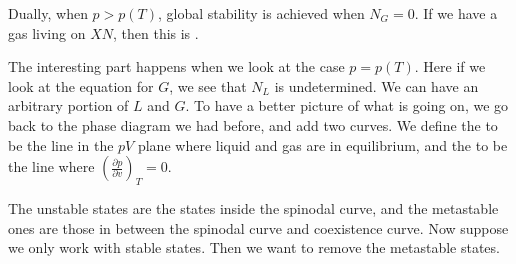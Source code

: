 \documentclass[a4paper]{article}
\def\isothermia{(1.6,0.3) (1.7,0.19847) (1.8,0.14429) (1.9,0.11496) (2.0,0.10000) (2.1,0.09349) (2.2,0.09194)}
\def\isothermib{(2.2,0.09194) (2.3,0.09328) (2.4,0.09623) (2.5,0.10000) (2.6,0.10411) (2.7,0.10825) (2.8,0.11224) (2.9,0.11600) (3.0,0.11944) (3.1,0.12257) (3.2,0.12536) (3.3,0.12782) (3.4,0.12997) (3.5,0.13184) (3.6,0.13343) (3.7,0.13477) (3.8,0.13588) (3.9,0.13679) (4.0,0.13750) (4.1,0.13804) (4.2,0.13843) (4.3,0.13867) (4.4,0.13879) (4.5,0.13880)}
\def\isothermic{(4.5,0.13880) (4.6,0.13871) (4.7,0.13852) (4.8,0.13825) (4.9,0.13791) (5.0,0.13750) (5.1,0.13703) (5.2,0.13652) (5.3,0.13595) (5.4,0.13535) (5.5,0.13471) (5.6,0.13404) (5.7,0.13334) (5.8,0.13262) (5.9,0.13187) (6.0,0.13111) (6.1,0.13033) (6.2,0.12954) (6.3,0.12874) (6.4,0.12793) (6.5,0.12711) (6.6,0.12629) (6.7,0.12546) (6.8,0.12463) (6.9,0.12379) (7.0,0.12296) (7.1,0.12212) (7.2,0.12129) (7.3,0.12046) (7.4,0.11963) (7.5,0.11880) (7.6,0.11798) (7.7,0.11716) (7.8,0.11635) (7.9,0.11554) (8.0,0.11473) (8.1,0.11393) (8.2,0.11314) (8.3,0.11235) (8.4,0.11157) (8.5,0.11080) (8.6,0.11003) (8.7,0.10927) (8.8,0.10851) (8.9,0.10776) (9.0,0.10702) (9.1,0.10629) (9.2,0.10556) (9.3,0.10484) (9.4,0.10413) (9.5,0.10342) (9.6,0.10272) (9.7,0.10203) (9.8,0.10135) (9.9,0.10067) (10.0,0.10000) (10.1,0.09934) (10.2,0.09868) (10.3,0.09803) (10.4,0.09739) (10.5,0.09675) (10.6,0.09613) (10.7,0.09550) (10.8,0.09489) (10.9,0.09428) (11.0,0.09368) (11.1,0.09308) (11.2,0.09249) (11.3,0.09191) (11.4,0.09133) (11.5,0.09076) (11.6,0.09020) (11.7,0.08964) (11.8,0.08909) (11.9,0.08854) (12.0,0.08801) (12.1,0.08747) (12.2,0.08694) (12.3,0.08642) (12.4,0.08590) (12.5,0.08539) (12.6,0.08489) (12.7,0.08438) (12.8,0.08389) (12.9,0.08340) (13.0,0.08291) (13.1,0.08243) (13.2,0.08196) (13.3,0.08149) (13.4,0.08103) (13.5,0.08057) (13.6,0.08011) (13.7,0.07966) (13.8,0.07921) (13.9,0.07877) (14.0,0.07834) (14.1,0.07790) (14.2,0.07748) (14.3,0.07705) (14.4,0.07663) (14.5,0.07622) (14.6,0.07581) (14.7,0.07540) (14.8,0.07500) (14.9,0.07460) (15.0,0.07421)}
\def\isothermi{\isothermia \isothermib \isothermic}
\def\isothermii{(1.8,0.3) (1.9,0.26107) (2.0,0.23150) (2.1,0.21303) (2.2,0.20153) (2.3,0.19444) (2.4,0.19016) (2.5,0.18767) (2.6,0.18629) (2.7,0.18560) (2.8,0.18530) (2.9,0.18521) (3.0,0.18519) (3.1,0.18518) (3.2,0.18513) (3.3,0.18499) (3.4,0.18477) (3.5,0.18444) (3.6,0.18401) (3.7,0.18347) (3.8,0.18285) (3.9,0.18213) (4.0,0.18133) (4.1,0.18046) (4.2,0.17952) (4.3,0.17852) (4.4,0.17747) (4.5,0.17637) (4.6,0.17523) (4.7,0.17406) (4.8,0.17285) (4.9,0.17163) (5.0,0.17038) (5.1,0.16911) (5.2,0.16783) (5.3,0.16654) (5.4,0.16524) (5.5,0.16393) (5.6,0.16263) (5.7,0.16132) (5.8,0.16001) (5.9,0.15871) (6.0,0.15741) (6.1,0.15612) (6.2,0.15483) (6.3,0.15355) (6.4,0.15228) (6.5,0.15102) (6.6,0.14977) (6.7,0.14853) (6.8,0.14730) (6.9,0.14608) (7.0,0.14488) (7.1,0.14368) (7.2,0.14250) (7.3,0.14133) (7.4,0.14018) (7.5,0.13903) (7.6,0.13790) (7.7,0.13679) (7.8,0.13568) (7.9,0.13459) (8.0,0.13352) (8.1,0.13245) (8.2,0.13140) (8.3,0.13037) (8.4,0.12934) (8.5,0.12833) (8.6,0.12733) (8.7,0.12634) (8.8,0.12537) (8.9,0.12441) (9.0,0.12346) (9.1,0.12252) (9.2,0.12160) (9.3,0.12068) (9.4,0.11978) (9.5,0.11889) (9.6,0.11801) (9.7,0.11715) (9.8,0.11629) (9.9,0.11545) (10.0,0.11461) (10.1,0.11379) (10.2,0.11297) (10.3,0.11217) (10.4,0.11138) (10.5,0.11060) (10.6,0.10982) (10.7,0.10906) (10.8,0.10831) (10.9,0.10756) (11.0,0.10683) (11.1,0.10610) (11.2,0.10539) (11.3,0.10468) (11.4,0.10398) (11.5,0.10329) (11.6,0.10261) (11.7,0.10193) (11.8,0.10127) (11.9,0.10061) (12.0,0.09996) (12.1,0.09932) (12.2,0.09868) (12.3,0.09806) (12.4,0.09744) (12.5,0.09683) (12.6,0.09622) (12.7,0.09562) (12.8,0.09503) (12.9,0.09445) (13.0,0.09387) (13.1,0.09330) (13.2,0.09274) (13.3,0.09218) (13.4,0.09163) (13.5,0.09109) (13.6,0.09055) (13.7,0.09001) (13.8,0.08949) (13.9,0.08897) (14.0,0.08845) (14.1,0.08794) (14.2,0.08744) (14.3,0.08694) (14.4,0.08645) (14.5,0.08596) (14.6,0.08548) (14.7,0.08500) (14.8,0.08453) (14.9,0.08406) (15.0,0.08360)}
\def\isothermiv{(1.7,0.3) (1.8,0.21929) (1.9,0.18163) (2.0,0.16000) (2.1,0.14803) (2.2,0.14194) (2.3,0.13944) (2.4,0.13909) (2.5,0.14000) (2.6,0.14161) (2.7,0.14354) (2.8,0.14558) (2.9,0.14757) (3.0,0.14944) (3.1,0.15114) (3.2,0.15263) (3.3,0.15391) (3.4,0.15497) (3.5,0.15584) (3.6,0.15651) (3.7,0.15699) (3.8,0.15731) (3.9,0.15748) (4.0,0.15750) (4.1,0.15740) (4.2,0.15718) (4.3,0.15686) (4.4,0.15644) (4.5,0.15594) (4.6,0.15537) (4.7,0.15473) (4.8,0.15404) (4.9,0.15329) (5.0,0.15250) (5.1,0.15167) (5.2,0.15080) (5.3,0.14991) (5.4,0.14899) (5.5,0.14804) (5.6,0.14708) (5.7,0.14611) (5.8,0.14512) (5.9,0.14412) (6.0,0.14311) (6.1,0.14210) (6.2,0.14108) (6.3,0.14006) (6.4,0.13904) (6.5,0.13802) (6.6,0.13700) (6.7,0.13599) (6.8,0.13497) (6.9,0.13396) (7.0,0.13296) (7.1,0.13196) (7.2,0.13097) (7.3,0.12998) (7.4,0.12900) (7.5,0.12803) (7.6,0.12707) (7.7,0.12612) (7.8,0.12517) (7.9,0.12423) (8.0,0.12330) (8.1,0.12238) (8.2,0.12147) (8.3,0.12057) (8.4,0.11968) (8.5,0.11880) (8.6,0.11792) (8.7,0.11706) (8.8,0.11620) (8.9,0.11536) (9.0,0.11452) (9.1,0.11369) (9.2,0.11288) (9.3,0.11207) (9.4,0.11127) (9.5,0.11048) (9.6,0.10970) (9.7,0.10893) (9.8,0.10817) (9.9,0.10741) (10.0,0.10667) (10.1,0.10593) (10.2,0.10520) (10.3,0.10448) (10.4,0.10377) (10.5,0.10307) (10.6,0.10238) (10.7,0.10169) (10.8,0.10101) (10.9,0.10034) (11.0,0.09968) (11.1,0.09902) (11.2,0.09838) (11.3,0.09774) (11.4,0.09710) (11.5,0.09648) (11.6,0.09586) (11.7,0.09525) (11.8,0.09465) (11.9,0.09405) (12.0,0.09346) (12.1,0.09288) (12.2,0.09230) (12.3,0.09173) (12.4,0.09117) (12.5,0.09061) (12.6,0.09006) (12.7,0.08951) (12.8,0.08897) (12.9,0.08844) (13.0,0.08791) (13.1,0.08739) (13.2,0.08688) (13.3,0.08637) (13.4,0.08586) (13.5,0.08537) (13.6,0.08487) (13.7,0.08438) (13.8,0.08390) (13.9,0.08342) (14.0,0.08295) (14.1,0.08248) (14.2,0.08202) (14.3,0.08156) (14.4,0.08111) (14.5,0.08066) (14.6,0.08022) (14.7,0.07978) (14.8,0.07935) (14.9,0.07892) (15.0,0.07849)}
\begin{document}
Dually, when $p > p(T)$, global stability is achieved when $N_G = 0$. If we have a gas living on $XN$, then this is .

The interesting part happens when we look at the case $p = p(T)$. Here if we look at the equation for $G$, we see that $N_L$ is undetermined. We can have an arbitrary portion of $L$ and $G$. To have a better picture of what is going on, we go back to the phase diagram we had before, and add two curves. We define the  to be the line in the $pV$ plane where liquid and gas are in equilibrium, and the  to be the line where $\left(\frac{\partial p}{\partial v}\right)_T = 0$.
\begin{center}
\end{center}
The unstable states are the states inside the spinodal curve, and the metastable ones are those in between the spinodal curve and coexistence curve. Now suppose we only work with stable states. Then we want to remove the metastable states.
\end{document}
